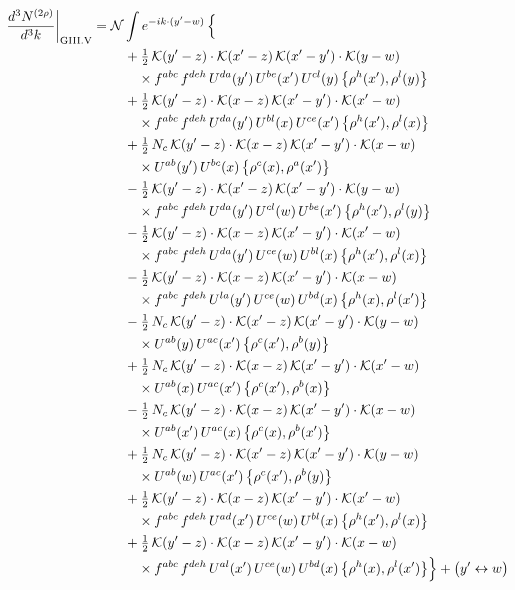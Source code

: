 \documentclass[10pt]{article}
\numberwithin{equation}{section}
\newcommand{\KK}{\mathcal K}
\newcommand{\NN}{\mathcal N}
\begin{document}
\begin{align}
\frac{d^3N^{(2\rho)}}{d^3k}\bigg|_{\rm GIII.V}={}&\NN\int e^{-ik\cdot(y'-w)}\,\Big\{\notag\\
&\quad +\tfrac12\,\KK(y'-z)\cdot\KK(x'-z)\,\KK(x'-y')\cdot\KK(y-w)\notag\\
&\qquad\times f^{abc}\,f^{deh}\,U^{da}(y')\,U^{be}(x')\,U^{cl}(y)\,\big\{\rho^{h}(x'),\rho^{l}(y)\big\}\notag\\
&\quad +\tfrac12\,\KK(y'-z)\cdot\KK(x-z)\,\KK(x'-y')\cdot\KK(x'-w)\notag\\
&\qquad\times f^{abc}\,f^{deh}\,U^{da}(y')\,U^{bl}(x)\,U^{ce}(x')\,\big\{\rho^{h}(x'),\rho^{l}(x)\big\}\notag\\
&\quad +\tfrac12\,N_{c}\,\KK(y'-z)\cdot\KK(x-z)\,\KK(x'-y')\cdot\KK(x-w)\notag\\
&\qquad\times U^{ab}(y')\,U^{bc}(x)\,\big\{\rho^{c}(x),\rho^{a}(x')\big\}\notag\\
&\quad -\tfrac12\,\KK(y'-z)\cdot\KK(x'-z)\,\KK(x'-y')\cdot\KK(y-w)\notag\\
&\qquad\times f^{abc}\,f^{deh}\,U^{da}(y')\,U^{cl}(w)\,U^{be}(x')\,\big\{\rho^{h}(x'),\rho^{l}(y)\big\}\notag\\
&\quad -\tfrac12\,\KK(y'-z)\cdot\KK(x-z)\,\KK(x'-y')\cdot\KK(x'-w)\notag\\
&\qquad\times f^{abc}\,f^{deh}\,U^{da}(y')\,U^{ce}(w)\,U^{bl}(x)\,\big\{\rho^{h}(x'),\rho^{l}(x)\big\}\notag\\
&\quad -\tfrac12\,\KK(y'-z)\cdot\KK(x-z)\,\KK(x'-y')\cdot\KK(x-w)\notag\\
&\qquad\times f^{abc}\,f^{deh}\,U^{la}(y')\,U^{ce}(w)\,U^{bd}(x)\,\big\{\rho^{h}(x),\rho^{l}(x')\big\}\notag\\
&\quad -\tfrac12\,N_{c}\,\KK(y'-z)\cdot\KK(x'-z)\,\KK(x'-y')\cdot\KK(y-w)\notag\\
&\qquad\times U^{ab}(y)\,U^{ac}(x')\,\big\{\rho^{c}(x'),\rho^{b}(y)\big\}\notag\\
&\quad +\tfrac12\,N_{c}\,\KK(y'-z)\cdot\KK(x-z)\,\KK(x'-y')\cdot\KK(x'-w)\notag\\
&\qquad\times U^{ab}(x)\,U^{ac}(x')\,\big\{\rho^{c}(x'),\rho^{b}(x)\big\}\notag\\
&\quad -\tfrac12\,N_{c}\,\KK(y'-z)\cdot\KK(x-z)\,\KK(x'-y')\cdot\KK(x-w)\notag\\
&\qquad\times U^{ab}(x')\,U^{ac}(x)\,\big\{\rho^{c}(x),\rho^{b}(x')\big\}\notag\\
&\quad +\tfrac12\,N_{c}\,\KK(y'-z)\cdot\KK(x'-z)\,\KK(x'-y')\cdot\KK(y-w)\notag\\
&\qquad\times U^{ab}(w)\,U^{ac}(x')\,\big\{\rho^{c}(x'),\rho^{b}(y)\big\}\notag\\
&\quad +\tfrac12\,\KK(y'-z)\cdot\KK(x-z)\,\KK(x'-y')\cdot\KK(x'-w)\notag\\
&\qquad\times f^{abc}\,f^{deh}\,U^{ad}(x')\,U^{ce}(w)\,U^{bl}(x)\,\big\{\rho^{h}(x'),\rho^{l}(x)\big\}\notag\\
&\quad +\tfrac12\,\KK(y'-z)\cdot\KK(x-z)\,\KK(x'-y')\cdot\KK(x-w)\notag\\
&\qquad\times f^{abc}\,f^{deh}\,U^{al}(x')\,U^{ce}(w)\,U^{bd}(x)\,\big\{\rho^{h}(x),\rho^{l}(x')\big\}\Big\}+\big(y'\leftrightarrow w\big)\label{eq:sum-GIII.V}
\end{align}
\end{document}
